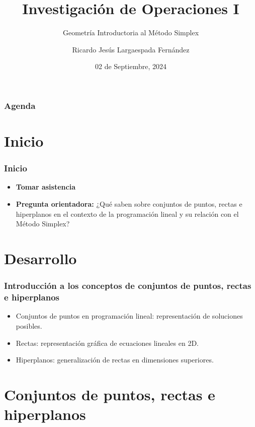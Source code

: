 \documentclass{beamer}
\title{Investigación de Operaciones I}
\subtitle{Geometría Introductoria al Método Simplex}
\author{Ricardo Jesús Largaespada Fernández}
\institute{Ingeniería de Sistemas, DACTIC, UNI}
\date{02 de Septiembre, 2024}
\begin{document}
\frame{\titlepage}

\begin{frame}
\frametitle{Agenda}
\tableofcontents
\end{frame}

\section{Inicio}
\begin{frame}
    \frametitle{Inicio}
    \begin{itemize}
        \item \textbf{Tomar asistencia}
        \item \textbf{Pregunta orientadora:} ¿Qué saben sobre conjuntos de puntos, rectas e hiperplanos en el contexto de la programación lineal y su relación con el Método Simplex?
    \end{itemize}
\end{frame}

\section{Desarrollo}
\begin{frame}
    \frametitle{Introducción a los conceptos de conjuntos de puntos, rectas e hiperplanos}
    \begin{itemize}
        \item Conjuntos de puntos en programación lineal: representación de soluciones posibles.
        \item Rectas: representación gráfica de ecuaciones lineales en 2D.
        \item Hiperplanos: generalización de rectas en dimensiones superiores.
    \end{itemize}
\end{frame}

\section{Conjuntos de puntos, rectas e hiperplanos}
\end{document}
